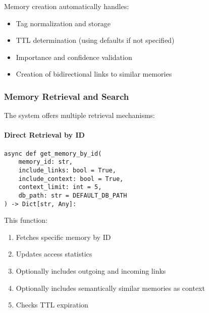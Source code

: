 \documentclass[12pt,a4paper]{article}
\begin{document}
Memory creation automatically handles:
\begin{itemize}
    \item Tag normalization and storage
    \item TTL determination (using defaults if not specified)
    \item Importance and confidence validation
    \item Creation of bidirectional links to similar memories
\end{itemize}

\subsubsection*{Memory Retrieval and Search}

The system offers multiple retrieval mechanisms:

\paragraph{Direct Retrieval by ID}
\begin{pageablecode}
\begin{verbatim}
async def get_memory_by_id(
    memory_id: str,
    include_links: bool = True,
    include_context: bool = True,
    context_limit: int = 5,
    db_path: str = DEFAULT_DB_PATH
) -> Dict[str, Any]:
\end{verbatim}
\end{pageablecode}
This function:
\begin{enumerate}[label=\arabic*.]
    \item Fetches specific memory by ID
    \item Updates access statistics
    \item Optionally includes outgoing and incoming links
    \item Optionally includes semantically similar memories as context
    \item Checks TTL expiration
\end{enumerate}
\end{document}
